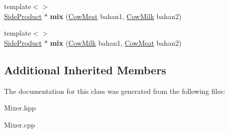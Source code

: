 \begin{DoxyCompactItemize}
\item 
\mbox{\label{class_mixer_a54f10fe4541b16bf790de96fa27f6c43}} 
{\footnotesize template$<$$>$ }\\\mbox{\hyperlink{class_side_product}{Side\+Product}} $\ast$ {\bfseries mix} (\mbox{\hyperlink{class_cow_meat}{Cow\+Meat}} bahan1, \mbox{\hyperlink{class_cow_milk}{Cow\+Milk}} bahan2)
\item 
\mbox{\label{class_mixer_a3a8e9598f1882e52f15493492fdc51bb}} 
{\footnotesize template$<$$>$ }\\\mbox{\hyperlink{class_side_product}{Side\+Product}} $\ast$ {\bfseries mix} (\mbox{\hyperlink{class_cow_milk}{Cow\+Milk}} bahan1, \mbox{\hyperlink{class_cow_meat}{Cow\+Meat}} bahan2)
\end{DoxyCompactItemize}
\subsection*{Additional Inherited Members}


The documentation for this class was generated from the following files\+:\begin{DoxyCompactItemize}
\item 
Mixer.\+hpp\item 
Mixer.\+cpp\end{DoxyCompactItemize}
